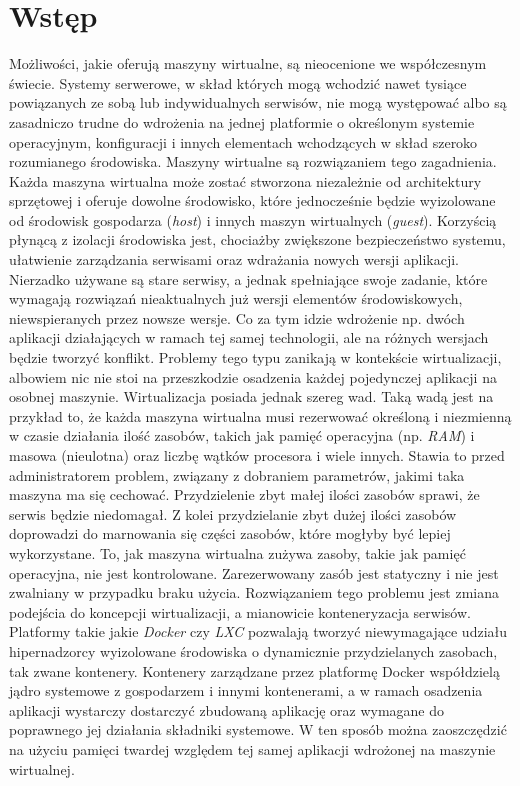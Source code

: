 \documentclass[polish, a4paper, 12pt, oneside]{book}
\begin{document}
	\tableofcontents{}
	
	\chapter{Wstęp}
	Możliwości, jakie oferują maszyny wirtualne, są nieocenione we współczesnym świecie. Systemy serwerowe, w skład których mogą wchodzić nawet tysiące powiązanych ze sobą lub indywidualnych serwisów, nie mogą występować albo są zasadniczo trudne do wdrożenia na jednej platformie o określonym systemie operacyjnym, konfiguracji i innych elementach wchodzących w skład szeroko rozumianego środowiska. Maszyny wirtualne są rozwiązaniem tego zagadnienia. Każda maszyna wirtualna może zostać stworzona niezależnie od architektury sprzętowej i oferuje dowolne środowisko, które jednocześnie będzie wyizolowane od środowisk gospodarza (\textit{host}) i innych maszyn wirtualnych (\textit{guest}). Korzyścią płynącą z izolacji środowiska jest, chociażby zwiększone bezpieczeństwo systemu, ułatwienie zarządzania serwisami oraz wdrażania nowych wersji aplikacji. Nierzadko używane są stare serwisy, a jednak spełniające swoje zadanie, które wymagają rozwiązań nieaktualnych już wersji elementów środowiskowych, niewspieranych przez nowsze wersje. Co za tym idzie wdrożenie np. dwóch aplikacji działających w ramach tej samej technologii, ale na różnych wersjach będzie tworzyć konflikt. Problemy tego typu zanikają w kontekście wirtualizacji, albowiem nic nie stoi na przeszkodzie osadzenia każdej pojedynczej aplikacji na osobnej maszynie. Wirtualizacja posiada jednak szereg wad. Taką wadą jest na przykład to, że każda maszyna wirtualna musi rezerwować określoną i niezmienną w czasie działania ilość zasobów, takich jak pamięć operacyjna (np. \textit{RAM}) i masowa (nieulotna) oraz liczbę wątków procesora i wiele innych. Stawia to przed administratorem problem, związany z dobraniem parametrów, jakimi taka maszyna ma się cechować. Przydzielenie zbyt małej ilości zasobów sprawi, że serwis będzie niedomagał. Z kolei przydzielanie zbyt dużej ilości zasobów doprowadzi do marnowania się części zasobów, które mogłyby być lepiej wykorzystane. To, jak maszyna wirtualna zużywa zasoby, takie jak pamięć operacyjna, nie jest kontrolowane. Zarezerwowany zasób jest statyczny i nie jest zwalniany w przypadku braku użycia. Rozwiązaniem tego problemu jest zmiana podejścia do koncepcji wirtualizacji, a mianowicie konteneryzacja serwisów. Platformy takie jakie \textit{Docker}\cite{docker} czy \textit{LXC}\cite{lxc} pozwalają tworzyć niewymagające udziału hipernadzorcy wyizolowane środowiska o dynamicznie przydzielanych zasobach, tak zwane kontenery. Kontenery zarządzane przez platformę Docker współdzielą jądro systemowe z gospodarzem i innymi kontenerami, a w ramach osadzenia aplikacji wystarczy dostarczyć zbudowaną aplikację oraz wymagane do poprawnego jej działania składniki systemowe. W ten sposób można zaoszczędzić na użyciu pamięci twardej względem tej samej aplikacji wdrożonej na maszynie wirtualnej. 
	
\end{document}
